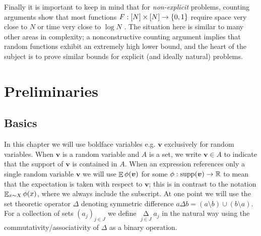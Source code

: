 Finally it is important to keep in mind that for \emph{non-explicit} problems, counting arguments show that most functions $F: [N] \times [N] \to \{0,1\}$ require space very close to $N$ or time very close to $\log N$ \cite{miltersen-bit-probe}. The situation here is similar to many other areas in complexity; a nonconstructive counting argument implies that random functions exhibit an extremely high lower bound, and the heart of the subject is to prove similar bounds for explicit (and ideally natural) problems.


\section{Preliminaries}\label{cellprobe:sec:prelims}
\subsection{Basics}\label{cellprobe:subsec:basic-prelims}
In this chapter we will use boldface variables e.g. $\bm{v}$ exclusively for random variables. When $\bm{v}$ is a random variable and $A$ is a set, we write $\bm{v} \in A$ to indicate that the support of $\bm{v}$ is contained in $A$. When an expression references only a single random variable $\bm{v}$ we will use $\mathop{\mathbb{E}} \phi(\bm{v})$ for some $\phi: \mathrm{supp}(\bm{v}) \to \mathbb{R}$ to mean that the expectation is taken with respect to $\bm{v}$; this is in contrast to the notation $\mathop{\mathbb{E}}_{x\sim X} \phi(x)$, where we always include the subscript.
At one point we will use the set theoretic operator $\Delta$ denoting symmetric difference $a \Delta b = (a \setminus b) \cup (b \setminus a)$. For a collection of sets $(a_j)_{j \in J}$ we define $\mathop{\Delta}\limits_{j \in J} a_j$ in the natural way using the commutativity/associativity of $\Delta$ as a binary operation.

